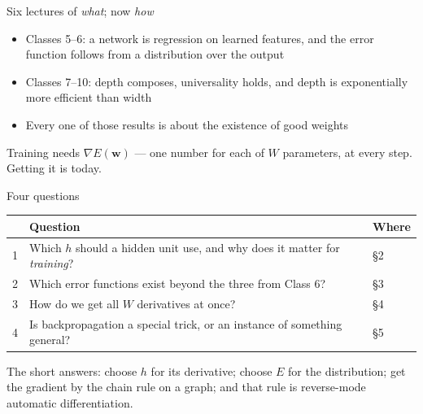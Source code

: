 \documentclass[aspectratio=169, 11pt]{beamer}
\newcommand{\nosrc}{}       %
\begin{document}
\begin{frame}{Six lectures of \emph{what}; now \emph{how}}
  \nosrc
  \vspace{0.2em}
  \begin{itemize}\setlength{\itemsep}{4pt}
    \item Classes 5--6: a network is regression on \alert{learned
          features}, and the error function follows from a
          \alert{distribution} over the output
    \item Classes 7--10: depth composes, universality holds, and
          \alert{depth is exponentially more efficient} than width
    \item Every one of those results is about the \alert{existence} of
          good weights
  \end{itemize}
  \vspace{0.4em}
  \begin{redhighlight}
    Training needs $\nabla E(\mathbf{w})$ --- one number for each of
    $W$ parameters, at every step. \alert{Getting it is today.}
  \end{redhighlight}
\end{frame}

\begin{frame}{Four questions}
  \nosrc
  \vspace{0.05em}
  \centering
  \renewcommand{\arraystretch}{1.35}
  {\small
  \begin{tabular}{p{} p{}
                  p{}}
    & \textbf{Question} & \textbf{Where}\\
    \hline
    1 & Which $h$ should a hidden unit use, and why does it matter
        for \emph{training}?
      & \S2\\
    2 & Which error functions exist beyond the three from Class 6?
      & \S3\\
    3 & How do we get all $W$ derivatives at once?
      & \S4\\
    4 & Is backpropagation a special trick, or an instance of
        something general?
      & \S5\\
    \hline
  \end{tabular}}
  \vspace{0.4em}

  {\small The short answers: choose $h$ for its \alert{derivative};
  choose $E$ for the \alert{distribution}; get the gradient by the
  \alert{chain rule on a graph}; and that rule is
  \alert{reverse-mode automatic differentiation}.}
\end{frame}
\end{document}
